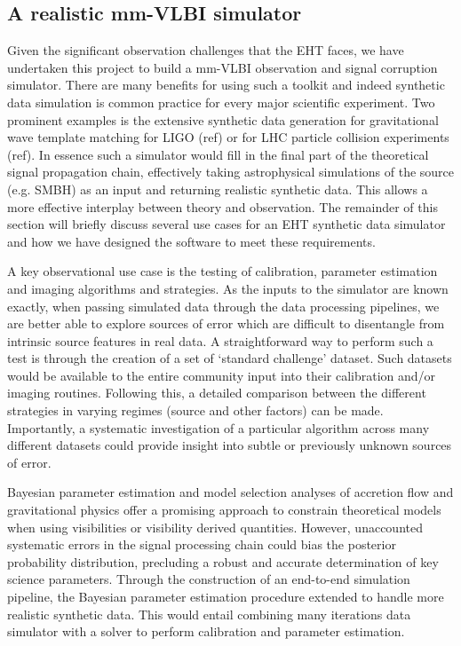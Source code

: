 \subsection{A realistic mm-VLBI simulator}

Given the significant observation challenges that the EHT faces, we have undertaken this project to build a mm-VLBI observation and signal corruption simulator.  There are many benefits for using such a toolkit and indeed synthetic data simulation is common practice for every major scientific experiment. Two prominent examples is the  extensive synthetic data generation for gravitational wave template matching for LIGO (ref) or for LHC particle collision experiments (ref). In essence such a simulator would fill in the final part of the theoretical signal propagation chain, effectively taking  astrophysical simulations of the source (e.g. SMBH) as an input and returning realistic synthetic data. This allows a more effective interplay between theory and observation. The remainder of this section will briefly discuss several use cases for an EHT synthetic data simulator and how we have designed the software to meet these requirements. 


A key observational use case is the testing of calibration, parameter estimation and imaging algorithms and strategies. As the inputs to the simulator are known exactly, when passing simulated data through the data processing pipelines, we are better able to explore sources of error which are difficult to disentangle from intrinsic source features in real data.  A straightforward way to perform such a test is through the creation of a set of `standard challenge' dataset. Such datasets would be available to the entire community input into their calibration and/or imaging routines. Following this, a detailed comparison between the different strategies in varying regimes (source and other factors) can be made. Importantly, a systematic investigation of a particular algorithm across many different datasets could provide insight into subtle or previously unknown sources of error.

Bayesian parameter estimation and model selection analyses of accretion flow \citep[e.g.][]{Broderick_2016} and gravitational physics \citep[e.g.][]{Broderick_2014, Psaltis_2016} offer a promising approach to constrain theoretical models when using visibilities or visibility derived quantities. However, unaccounted systematic errors in the signal processing chain could bias  the posterior probability distribution, precluding a robust and accurate determination of key science parameters. Through the construction of an end-to-end simulation pipeline, the Bayesian parameter estimation procedure extended to handle more realistic synthetic data. This would entail combining many iterations data simulator with a solver to perform calibration and parameter estimation. %

